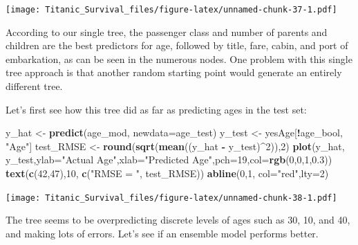 \documentclass[]{article}
\newenvironment{Shaded}{\begin{snugshade}}{\end{snugshade}}
\newcommand{\KeywordTok}[1]{\textcolor[rgb]{0.13,0.29,0.53}{\textbf{#1}}}
\newcommand{\DataTypeTok}[1]{\textcolor[rgb]{0.13,0.29,0.53}{#1}}
\newcommand{\DecValTok}[1]{\textcolor[rgb]{0.00,0.00,0.81}{#1}}
\newcommand{\FloatTok}[1]{\textcolor[rgb]{0.00,0.00,0.81}{#1}}
\newcommand{\StringTok}[1]{\textcolor[rgb]{0.31,0.60,0.02}{#1}}
\newcommand{\OperatorTok}[1]{\textcolor[rgb]{0.81,0.36,0.00}{\textbf{#1}}}
\newcommand{\NormalTok}[1]{#1}
\begin{document}
\texttt{[image: Titanic\_Survival\_files/figure-latex/unnamed-chunk-37-1.pdf]}

According to our single tree, the passenger class and number of parents
and children are the best predictors for age, followed by title, fare,
cabin, and port of embarkation, as can be seen in the numerous nodes.
One problem with this single tree approach is that another random
starting point would generate an entirely different tree.

Let's first see how this tree did as far as predicting ages in the test
set:

\begin{Shaded}
\begin{Highlighting}[]
\NormalTok{y_hat <-}\StringTok{ }\KeywordTok{predict}\NormalTok{(age_mod, }\DataTypeTok{newdata=}\NormalTok{age_test)}
\NormalTok{y_test <-}\StringTok{ }\NormalTok{yesAge[}\OperatorTok{!}\NormalTok{age_bool, }\StringTok{"Age"}\NormalTok{]}
\NormalTok{test_RMSE <-}\StringTok{ }\KeywordTok{round}\NormalTok{(}\KeywordTok{sqrt}\NormalTok{(}\KeywordTok{mean}\NormalTok{((y_hat }\OperatorTok{-}\StringTok{ }\NormalTok{y_test)}\OperatorTok{^}\DecValTok{2}\NormalTok{)),}\DecValTok{2}\NormalTok{)}
\KeywordTok{plot}\NormalTok{(y_hat, y_test,}\DataTypeTok{ylab=}\StringTok{"Actual Age"}\NormalTok{,}\DataTypeTok{xlab=}\StringTok{"Predicted Age"}\NormalTok{,}\DataTypeTok{pch=}\DecValTok{19}\NormalTok{,}\DataTypeTok{col=}\KeywordTok{rgb}\NormalTok{(}\DecValTok{0}\NormalTok{,}\DecValTok{0}\NormalTok{,}\DecValTok{1}\NormalTok{,}\FloatTok{0.3}\NormalTok{))}
\KeywordTok{text}\NormalTok{(}\KeywordTok{c}\NormalTok{(}\DecValTok{42}\NormalTok{,}\DecValTok{47}\NormalTok{),}\DecValTok{10}\NormalTok{, }\KeywordTok{c}\NormalTok{(}\StringTok{"RMSE = "}\NormalTok{, test_RMSE))}
\KeywordTok{abline}\NormalTok{(}\DecValTok{0}\NormalTok{,}\DecValTok{1}\NormalTok{, }\DataTypeTok{col=}\StringTok{"red"}\NormalTok{,}\DataTypeTok{lty=}\DecValTok{2}\NormalTok{)}
\end{Highlighting}
\end{Shaded}

\texttt{[image: Titanic\_Survival\_files/figure-latex/unnamed-chunk-38-1.pdf]}

The tree seems to be overpredicting discrete levels of ages such as 30,
10, and 40, and making lots of errors. Let's see if an ensemble model
performs better.
\end{document}
